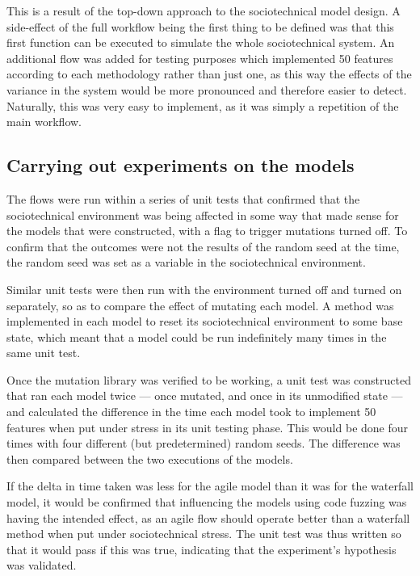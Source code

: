 This is a result of the top-down approach to the sociotechnical model design. A side-effect of the full workflow being the first thing to be defined was that this first function can be executed to simulate the whole sociotechnical system. An additional flow was added for testing purposes which implemented 50 features according to each methodology rather than just one, as this way the effects of the variance in the system would be more pronounced and therefore easier to detect. Naturally, this was very easy to implement, as it was simply a repetition of the main workflow.\par

\subsection{Carrying out experiments on the models}
The flows were run within a series of unit tests that confirmed that the sociotechnical environment was being affected in some way that made sense for the models that were constructed, with a flag to trigger mutations turned off. To confirm that the outcomes were not the results of the random seed at the time, the random seed was set as a variable in the sociotechnical environment.\par

Similar unit tests were then run with the environment turned off and turned on separately, so as to compare the effect of mutating each model. A method was implemented in each model to reset its sociotechnical environment to some base state, which meant that a model could be run indefinitely many times in the same unit test. \par

Once the mutation library was verified to be working, a unit test was constructed that ran each model twice --- once mutated, and once in its unmodified state --- and calculated the difference in the time each model took to implement 50 features when put under stress in its unit testing phase. This would be done four times with four different (but predetermined) random seeds. The difference was then compared between the two executions of the models. \par

If the delta in time taken was less for the agile model than it was for the waterfall model, it would be confirmed that influencing the models using code fuzzing was having the intended effect, as an agile flow should operate better than a waterfall method when put under sociotechnical stress. The unit test was thus written so that it would pass if this was true, indicating that the experiment's hypothesis was validated. \par

